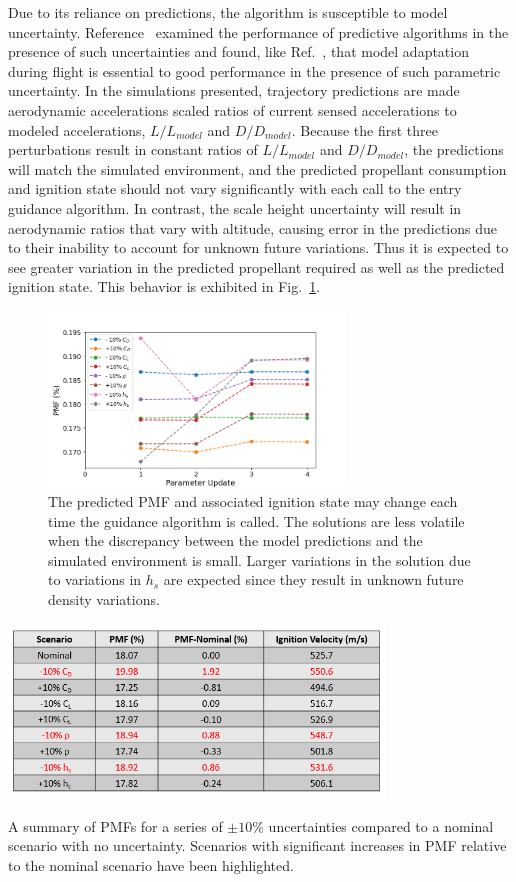 \documentclass[letterpaper, paper,11pt]{AAS}
\begin{document}
Due to its reliance on predictions, the algorithm is susceptible to model uncertainty. Reference~\cite{predictor_corrector_analysis} examined the performance of predictive algorithms in the presence of such uncertainties and found, like Ref.~\cite{lu2014entry}, that model adaptation during flight is essential to good performance in the presence of such parametric uncertainty. In the simulations presented, trajectory predictions are made aerodynamic accelerations scaled ratios of current sensed accelerations to modeled accelerations, $L/L_{model}$ and $ D/D_{model} $. Because the first three perturbations result in constant ratios of $L/L_{model}$ and $ D/D_{model} $, the predictions will match the simulated environment, and the predicted propellant consumption and ignition state should not vary significantly with each call to the entry guidance algorithm. In contrast, the scale height uncertainty will result in aerodynamic ratios that vary with altitude, causing error in the predictions due to their inability to account for unknown future variations. Thus it is expected to see greater variation in the predicted propellant required as well as the predicted ignition state. This behavior is exhibited in Fig.~\ref{fig_parametric_updates}.
\begin{figure}[h!]
	\centering
	\includegraphics[width=0.7\textwidth]{ParameterUpdates} 
	\caption{The predicted PMF and associated ignition state may change each time the guidance algorithm is called. The solutions are less volatile when the discrepancy between the model predictions and the simulated environment is small. Larger variations in the solution due to variations in $h_s$ are expected since they result in unknown future density variations.}
	\label{fig_parametric_updates}
\end{figure}
\begin{table}[h!]
	\centering
	\includegraphics[width=0.75\textwidth]{ParametricSensitivityTable} 
	\caption{A summary of PMFs for a series of $\pm10\%$ uncertainties compared to a nominal scenario with no uncertainty. Scenarios with significant increases in PMF relative to the nominal scenario have been highlighted.}
	\label{table_parametric}
\end{table}
\end{document}
